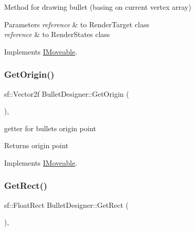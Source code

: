 Method for drawing bullet (basing on current vertex array) 


\begin{DoxyParams}{Parameters}
{\em reference} & to Render\+Target class \\
\hline
{\em reference} & to Render\+States class \\
\hline
\end{DoxyParams}


Implements \mbox{\hyperlink{class_i_moveable}{I\+Moveable}}.

\mbox{\label{class_bullet_designer_a89c3e817069b20e9404a01c3bdeaa481}} 
\subsubsection{\texorpdfstring{Get\+Origin()}{GetOrigin()}}
{\footnotesize\ttfamily sf\+::\+Vector2f Bullet\+Designer\+::\+Get\+Origin (\begin{DoxyParamCaption}{ }\end{DoxyParamCaption})\hspace{0.3cm}{\ttfamily [override]}, {\ttfamily [virtual]}}



getter for bullet\textquotesingle{}s origin point 

\begin{DoxyReturn}{Returns}
origin point 
\end{DoxyReturn}


Implements \mbox{\hyperlink{class_i_moveable}{I\+Moveable}}.

\mbox{\label{class_bullet_designer_ae7be5a8d1bef2c771715b5b8efce24ce}} 
\subsubsection{\texorpdfstring{Get\+Rect()}{GetRect()}}
{\footnotesize\ttfamily sf\+::\+Float\+Rect Bullet\+Designer\+::\+Get\+Rect (\begin{DoxyParamCaption}{ }\end{DoxyParamCaption})\hspace{0.3cm}{\ttfamily [override]}, {\ttfamily [virtual]}}



